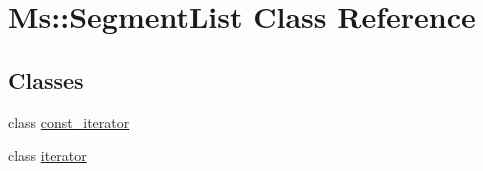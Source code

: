 \hypertarget{class_ms_1_1_segment_list}{}\section{Ms\+:\+:Segment\+List Class Reference}
\label{class_ms_1_1_segment_list}
\subsection*{Classes}
\begin{DoxyCompactItemize}
\item 
class \hyperlink{class_ms_1_1_segment_list_1_1const__iterator}{const\+\_\+iterator}
\item 
class \hyperlink{class_ms_1_1_segment_list_1_1iterator}{iterator}
\end{DoxyCompactItemize}
